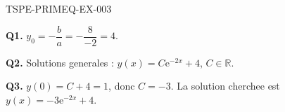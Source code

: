 \begin{corrige}{TSPE-PRIMEQ-EX-003}

\textbf{Q1.} $y_0 = -\dfrac{b}{a} = -\dfrac{8}{-2} = 4$.

\textbf{Q2.} Solutions generales : $y(x) = C\mathrm{e}^{-2x} + 4$, $C \in \mathbb{R}$.

\textbf{Q3.} $y(0) = C + 4 = 1$, donc $C=-3$. La solution cherchee est $y(x) = -3\mathrm{e}^{-2x}+4$.

\end{corrige}
